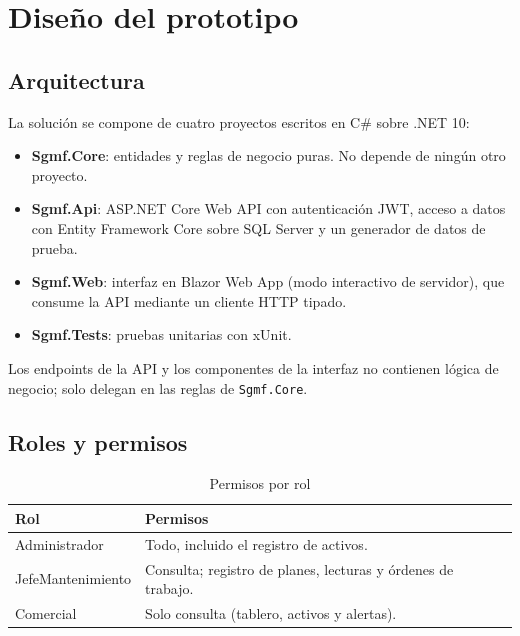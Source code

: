\documentclass[12pt,letterpaper]{article}
\begin{document}
\section{Diseño del prototipo}\label{sec:diseno}

\subsection{Arquitectura}

La solución se compone de cuatro proyectos escritos en C\# sobre .NET 10:

\begin{itemize}
  \item \textbf{Sgmf.Core}: entidades y reglas de negocio puras. No depende de ningún otro proyecto.
  \item \textbf{Sgmf.Api}: ASP.NET Core Web API con autenticación JWT, acceso a datos con Entity Framework Core sobre SQL Server y un generador de datos de prueba.
  \item \textbf{Sgmf.Web}: interfaz en Blazor Web App (modo interactivo de servidor), que consume la API mediante un cliente HTTP tipado.
  \item \textbf{Sgmf.Tests}: pruebas unitarias con xUnit.
\end{itemize}

Los endpoints de la API y los componentes de la interfaz no contienen lógica de negocio; solo delegan en las reglas de \texttt{Sgmf.Core}.

\subsection{Roles y permisos}

\begin{table}[H]
  \centering
  \caption{Permisos por rol}\label{tab:roles}
  \begin{tabularx}{\textwidth}{@{}lX@{}}
    \toprule
    Rol & Permisos \\
    \midrule
    Administrador & Todo, incluido el registro de activos. \\
    JefeMantenimiento & Consulta; registro de planes, lecturas y órdenes de trabajo. \\
    Comercial & Solo consulta (tablero, activos y alertas). \\
    \bottomrule
  \end{tabularx}
\end{table}
\end{document}
